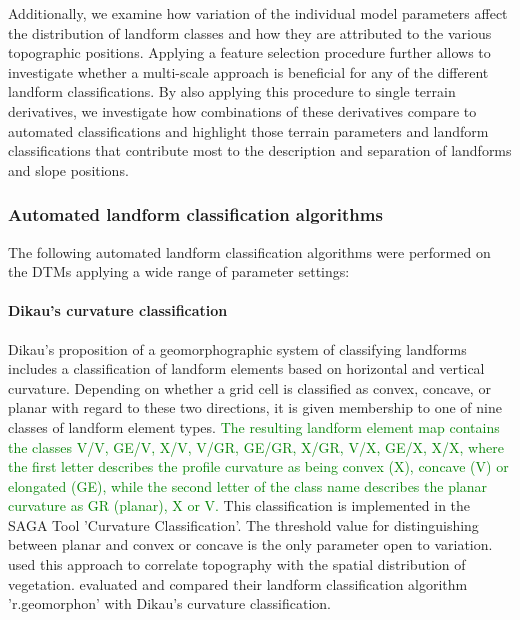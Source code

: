 \documentclass[preprint,12pt,authoryear]{elsarticle}
\begin{document}
 Additionally, we examine how variation of the individual model parameters affect the distribution of landform classes and how they are attributed to the various topographic positions. Applying a feature selection procedure further allows to investigate whether a multi-scale approach is beneficial for any of the different landform classifications. By also applying this procedure to single terrain derivatives, we investigate how combinations of these derivatives compare to automated classifications and highlight those terrain parameters and landform classifications that contribute most to the description and separation of landforms and slope positions.
\subsubsection{Automated landform classification algorithms}
 The following automated landform classification algorithms were performed on the DTMs applying a wide range of parameter settings:
\paragraph{Dikau's curvature classification \citep{Dikau1988}}
Dikau's proposition of a geomorphographic system of classifying landforms includes a classification of landform elements based on horizontal and vertical curvature. Depending on whether a grid cell is classified as convex, concave, or  planar with regard to these two directions, it is given membership to one of nine classes of landform element types. \textcolor{green}{The resulting landform element map contains the classes V/V, GE/V, X/V, V/GR, GE/GR, X/GR, V/X, GE/X, X/X, where the first letter describes the profile curvature as being convex (X), concave (V) or elongated (GE), while the second letter of the class name describes the planar curvature as GR (planar), X or V.} This classification is implemented in the SAGA Tool 'Curvature Classification'. The threshold value for distinguishing between planar and convex or concave is the only parameter open to variation. \cite{Hoersch2002} used this approach to correlate topography with the spatial distribution of vegetation. \cite{Jasiewicz2013} evaluated and compared their landform classification algorithm 'r.geomorphon' with Dikau's curvature classification. 
\end{document}
